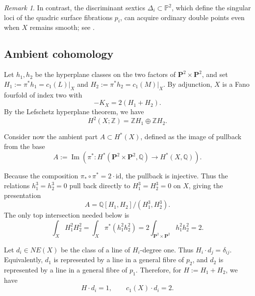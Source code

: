 \documentclass{amsart}
\theoremstyle{definition}
\theoremstyle{remark}
\newtheorem{remark}[theorem]{Remark}
\newcommand{\QQ}{\mathbb Q}
\begin{document}
\begin{remark}
In contrast, the discriminant sextics $\Delta_i \subset \mathbb{P}^2$, which define the singular loci of the quadric surface fibrations $p_i$, can acquire ordinary double points even when $X$ remains smooth; see \cite[Proposition~1.2]{Beauville1977}. 

\end{remark}
 
\subsection{Ambient cohomology}
\label{ssec:amb}
Let \(h_1,h_2\) be the hyperplane classes on the two factors of
\(\mathbf P^2\times\mathbf P^2\), and set \(H_1 := \pi^*h_1 = c_1(L)|_X\) and \(H_2 := \pi^*h_2 = c_1(M)|_X\). By adjunction, \(X\) is a Fano fourfold of index two with
\[
  -K_X=2(H_1+H_2).
\]
By the Lefschetz hyperplane theorem, we have
\[
  H^2(X; \mathbb{Z}) = \mathbb{Z} H_1 \oplus \mathbb{Z} H_2.
\]

Consider now the ambient part $A \subset H^*(X)$, defined as the image of
pullback from the base
\[
  A:=\operatorname{Im}\!\left(
  \pi^*:H^*(\mathbf P^2\times\mathbf P^2,\QQ)\to H^*(X,\QQ)
  \right).
\]

Because the composition $\pi_* \circ \pi^* = 2 \cdot \mathrm{id}$, the pullback is injective. Thus the relations $h_1^3 = h_2^3 = 0$ pull back directly to $H_1^3 = H_2^3 = 0$ on $X$, giving the presentation
$$
  A  = \QQ[H_1, H_2]/(H_1^3, H_2^3).
$$
The only top intersection needed below is
\[
  \int_X H_1^2H_2^2
  =
  \int_X\pi^*(h_1^2h_2^2)
  =
  2\int_{\mathbf P^2\times\mathbf P^2}h_1^2h_2^2
  =
  2.
\]

Let \(d_i\in NE(X)\) be the class of a line of \(H_i\)-degree one. Thus $H_i\cdot d_j=\delta_{ij}$. Equivalently, \(d_1\) is represented by a line in a general fibre of \(p_2\), and
\(d_2\) is represented by a line in a general fibre of \(p_1\). Therefore, for $H:=H_1+H_2$, we have \[H\cdot d_i=1,\qquad c_1(X)\cdot d_i=2.\]
\end{document}
